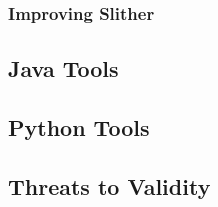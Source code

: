 \subsubsection{Improving Slither}

\subsection{Java Tools}

\subsection{Python Tools}

\subsection{Threats to Validity}